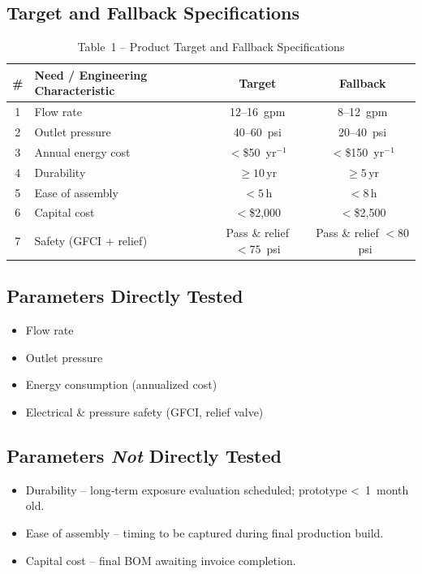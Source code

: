 \documentclass[12pt]{report}
\begin{document}
\subsection{Target and Fallback Specifications}
\begin{table}[h]
  \centering
  \caption*{Table 1 -- Product Target and Fallback Specifications}
  \begin{tabular}{@{}clcc@{}}
    \toprule
    \# & Need / Engineering Characteristic & Target & Fallback \\
    \midrule
    1 & Flow rate              & 12–16 gpm & 8–12 gpm \\
    2 & Outlet pressure        & 40–60 psi & 20–40 psi \\
    3 & Annual energy cost     & $<$\$50 yr$^{-1}$ & $<$\$150 yr$^{-1}$ \\
    4 & Durability             & $\ge10\,\mathrm{yr}$ & $\ge5\,\mathrm{yr}$ \\
    5 & Ease of assembly       & $<5\,\mathrm{h}$ & $<8\,\mathrm{h}$ \\
    6 & Capital cost           & $<$\$2{,}000 & $<$\$2{,}500 \\
    7 & Safety (GFCI + relief) & Pass \& relief $<75$ psi & Pass \& relief $<80$ psi \\
    \bottomrule
  \end{tabular}
\end{table}

\subsection{Parameters Directly Tested}
\begin{itemize}[leftmargin=*]
  \item Flow rate
  \item Outlet pressure
  \item Energy consumption (annualized cost)
  \item Electrical \& pressure safety (GFCI, relief valve)
\end{itemize}

\subsection{Parameters \emph{Not} Directly Tested}
\begin{itemize}[leftmargin=*]
  \item Durability – long‐term exposure evaluation scheduled; prototype < 1 month old.
  \item Ease of assembly – timing to be captured during final production build.
  \item Capital cost – final BOM awaiting invoice completion.
\end{itemize}
\end{document}

